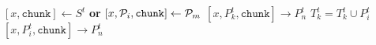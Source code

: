 \documentclass{article}
\begin{document}
\pagestyle{empty}

\newcommand{\send}{\Rightarrow}
\newcommand{\sendto}{\rightarrow}
\algrenewcommand{}

\begin{algorithmic}

  \State $[x,\mathtt{chunk}] \gets S^t$ \textbf{or} $[x,{\cal P}_i,\mathtt{chunk}] \gets {\cal P}_m$
  \State $[x,P^t_k,\mathtt{chunk}] \sendto P^t_n$
  \EndFor
  \EndIf
  \State $T^t_k = T^t_k \cup P^t_i$
  \EndIf
  \State $[x,P^t_i,\mathtt{chunk}] \sendto P^t_n$
  \EndIf
  \EndFor
  \EndIf
  \EndWhile
  \EndProcedure
  
\end{algorithmic}
\end{document}
